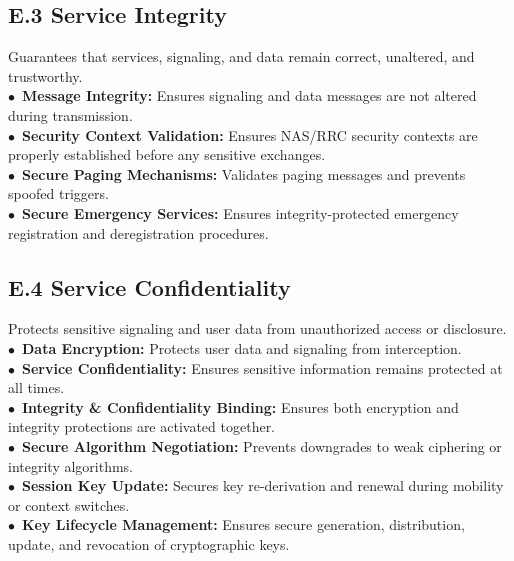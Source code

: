\documentclass[sigconf]{acmart}
\begin{document}
{\subsection*{E.3 Service Integrity}
Guarantees that services, signaling, and data remain correct, unaltered, and trustworthy. \\
\noindent$\bullet$~\textbf{Message Integrity:} Ensures signaling and data messages are not altered during transmission.  \\
\noindent$\bullet$~\textbf{Security Context Validation:} Ensures NAS/RRC security contexts are properly established before any sensitive exchanges.  \\
\noindent$\bullet$~\textbf{Secure Paging Mechanisms:} Validates paging messages and prevents spoofed triggers.  \\
\noindent$\bullet$~\textbf{Secure Emergency Services:} Ensures integrity-protected emergency registration and deregistration procedures.  


\subsection*{E.4 Service Confidentiality}
Protects sensitive signaling and user data from unauthorized access or disclosure.\\
\noindent$\bullet$~\textbf{Data Encryption:} Protects user data and signaling from interception. \\  
\noindent$\bullet$~\textbf{Service Confidentiality:} Ensures sensitive information remains protected at all times.  \\
\noindent$\bullet$~\textbf{Integrity \& Confidentiality Binding:} Ensures both encryption and integrity protections are activated together.  \\
\noindent$\bullet$~\textbf{Secure Algorithm Negotiation:} Prevents downgrades to weak ciphering or integrity algorithms.  \\
\noindent$\bullet$~\textbf{Session Key Update:} Secures key re-derivation and renewal during mobility or context switches.  \\
\noindent$\bullet$~\textbf{Key Lifecycle Management:} Ensures secure generation, distribution, update, and revocation of cryptographic keys.  

}
\end{document}
